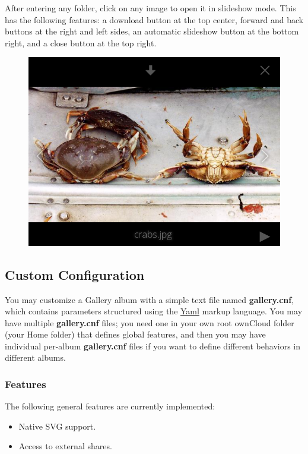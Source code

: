 \documentclass[letterpaper,10pt,english]{sphinxmanual}
\begin{document}
After entering any folder, click on any image to open it in slideshow mode.
This has the following features: a download button at the top center, forward
and back buttons at the right and left sides, an automatic slideshow button at
the bottom right, and a close button at the top right.
\begin{figure}[htbp]
\centering

\includegraphics{gallery-2.png}
\end{figure}


\subsection{Custom Configuration}
\label{files/gallery_app:custom-configuration}
You may customize a Gallery album with a simple text file named
\textbf{gallery.cnf}, which contains parameters structured using the
\href{https://en.wikipedia.org/wiki/YAML}{Yaml} markup language. You may have
multiple \textbf{gallery.cnf} files; you need one in your own root ownCloud folder
(your Home folder) that defines global features, and then you may have
individual per-album \textbf{gallery.cnf} files if you want to define different
behaviors in different albums.


\subsubsection{Features}
\label{files/gallery_app:features}
The following general features are currently implemented:
\begin{itemize}
\item {} 
Native SVG support.

\item {} 
Access to external shares.

\end{itemize}
\end{document}
